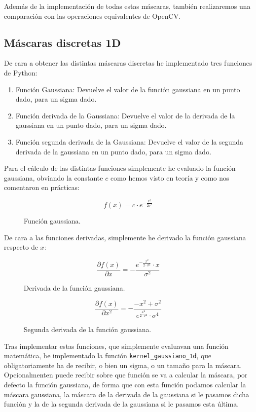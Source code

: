 \documentclass[12pt, spanish]{article}
\begin{document}
Además de la implementación de todas estas máscaras, también realizaremos una comparación con las operaciones equivalentes de OpenCV.

\subsection{Máscaras discretas 1D}

De cara a obtener las distintas máscaras discretas he implementado tres funciones de Python:

\begin{enumerate}
	\item Función Gaussiana: Devuelve el valor de la función gaussiana en un punto dado, para un sigma dado.
	\item Función derivada de la Gaussiana: Devuelve el valor de la derivada de la gaussiana en un punto dado, para un sigma dado.
	\item Función segunda derivada de la Gaussiana: Devuelve el valor de la segunda derivada de la gaussiana en un punto dado, para un sigma dado.
\end{enumerate}


Para el cálculo de las distintas funciones simplemente he evaluado la función gaussiana, obviando la constante $c$ como hemos visto en teoría y como nos comentaron en prácticas:

\begin{figure}[H]
	\centering
	\[ f(x) = c \cdot e^{- \frac{x^2}{2\sigma^2}} \]
	\caption{Función gaussiana.}
	\label{f_gaussiana}
\end{figure}


De cara a las funciones derivadas, simplemente he derivado la función gaussiana respecto de $x$:


\begin{figure}[H]
	\centering
	\[ \frac{\partial{f(x)}}{\partial{x}} = -\frac{e^{ -\frac{x^2}{2 \cdot \sigma^2} } \cdot x}{\sigma^2} \]
	\caption{Derivada de la función gaussiana.}
	\label{d_f_gaussiana}
\end{figure}

\begin{figure}[H]
	\centering
	\[ \frac{\partial{f(x)}}{\partial{x^2}} = -\frac{- x^2 + \sigma^2}{e^{ \frac{x^2}{2 \cdot \sigma^2} } \cdot \sigma^4} \]
	\caption{Segunda derivada de la función gaussiana.}
	\label{2d_f_gaussiana}
\end{figure}


Tras implementar estas funciones, que simplemente evaluavan una función matemática, he implementado la función \texttt{kernel\_gaussiano\_1d}, que obligatoriamente ha de recibir, o bien un sigma, o un tamaño para la máscara. Opcionalmenten puede recibir sobre que función se va a calcular la máscara, por defecto la función gaussiana, de forma que con esta función podamos calcular la máscara gaussiana, la máscara de la derivada de la gaussiana si le pasamos dicha función y la de la segunda derivada de la gaussiana si le pasamos esta última.
\end{document}
